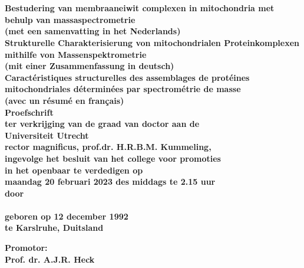 \begin{titlepage}
    \begin{center}
        {\huge \bfseries \thesistitle \par \ }\\
        [0.5cm]
        {\small \bfseries Bestudering van membraaneiwit complexen in mitochondria met behulp van massaspectrometrie\\
        (met een samenvatting in het Nederlands)}\\
        [0.25cm]
        {\small \bfseries Strukturelle Charakterisierung von mitochondrialen Proteinkomplexen mithilfe von Massenspektrometrie\\
        (mit einer Zusammenfassung in deutsch)}\\
        [0.25cm]
        {\small \bfseries Caractéristiques structurelles des assemblages de protéines mitochondriales déterminées par spectrométrie de masse\\
        (avec un résumé en français)}\\
        [2cm]
        {\Large \bfseries Proefschrift}\\
        \bigskip
        \bigskip
        {\small \bfseries ter verkrijging van de graad van doctor aan de\\
            Universiteit Utrecht\\
            rector magnificus, prof.dr. H.R.B.M. Kummeling,\\
            ingevolge het besluit van het college voor promoties\\
            in het openbaar te verdedigen op\\
            \bigskip
            maandag 20 februari 2023 des middags te 2.15 uur}\\
        [1cm]
        {\small \bfseries door}\\
        [1cm]

        {\large \bfseries\name\\
        \smallskip
        \small geboren op 12 december 1992\\
        te Karslruhe, Duitsland}

    \end{center}

    \clearpage

    \begin{flushleft}
        {\bfseries Promotor:\\
            \small Prof. dr. A.J.R. Heck}
    \end{flushleft}

\end{titlepage}